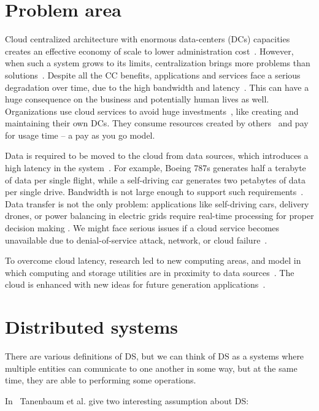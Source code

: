 \section{Problem area}\label{sec:problem_area}
%
Cloud centralized architecture with enormous data-centers (DCs) capacities creates an effective economy of scale to lower administration cost~\cite{BariBEGPRZZ13}. However, when such a  system grows to its limits, centralization brings more problems than solutions~\cite{GunawiHSLSAE16, LopezMEDHIBFR15}. Despite all the CC benefits, applications and services face a serious degradation over time, due to the high bandwidth and latency~\cite{KarimIWGSYO16}. This can have a huge consequence on the business and potentially human lives as well. Organizations use cloud services to avoid huge investments~\cite{MonsalveCC18}, like creating and maintaining their own DCs. They consume resources created by others~\cite{Satyanarayanan17} and pay for usage time -- a pay as you go model.

Data is required to be moved to the cloud from data sources, which introduces a high latency in the system~\cite{HossainRH18}. For example, Boeing 787s generates half a terabyte of data per single flight, while a self-driving car generates two petabytes of data per single drive. Bandwidth is not large enough to support such requirements~\cite{CaoZS18}. Data transfer is not the only problem: applications like self-driving cars, delivery drones, or power balancing in electric grids require real-time processing for proper decision making \cite{CaoZS18}. We might face serious issues if a cloud service becomes unavailable due to denial-of-service attack, network, or cloud failure~\cite{GunawiHSLSAE16}.

To overcome cloud latency, research led to new computing areas, and model in which computing and storage utilities are in proximity to data sources~\cite{Satyanarayanan17}. The cloud is enhanced with new ideas for future generation applications~\cite{NingLSY20}. 
%
%
%
\section{Distributed systems}\label{sec:distributed_systems}
%
There are various definitions of DS, but we can think of DS as a systems where multiple entities can comunicate to one another in some way, but at the same time, they are able to performing some operations. 

In~\cite{SteenT16, 0019513} Tanenbaum et al. give two interesting assumption about DS:

